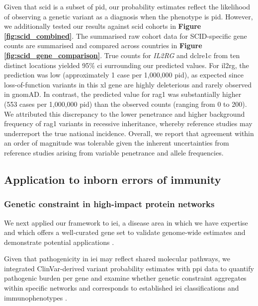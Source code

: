 Given that \ac{scid} is a subset of \ac{pid}, our probability estimates reflect the likelihood of observing a genetic variant as a diagnosis when the phenotype is \ac{pid}. 
However, we additionally tested our results against \ac{scid} cohorts in 
 \textbf{Figure \ref{fig:scid_combined}}.
The summarised raw cohort data for SCID-specific gene counts are summarised and compared across countries in \textbf{Figure \ref{fig:scid_gene_comparison}}.
True counts for \textit{IL2RG} and \ac{dclre1c} from ten distinct locations yielded 95\% \ac{ci} surrounding our predicted values. 
For \ac{il2rg}, the prediction was low (approximately 1 case per 1,000,000 \ac{pid}), as expected since loss-of-function variants in this \ac{xl} gene are highly deleterious and rarely observed in gnomAD. In contrast, the predicted value for \ac{rag1} was substantially higher (553 cases per 1,000,000 \ac{pid}) than the observed counts (ranging from 0 to 200). 
We attributed this discrepancy to the lower penetrance and higher background frequency of \ac{rag1} variants in recessive inheritance, whereby reference studies may underreport the true national incidence. 
Overall, we report that agreement within an order of magnitude was tolerable given the inherent uncertainties from reference studies arising from variable penetrance and allele frequencies.

\FloatBarrier

\subsection{Application to inborn errors of immunity}
\subsubsection{Genetic constraint in high-impact protein networks}

We next applied our framework to \ac{iei},  a disease area in which we have expertise and which offers a well-curated gene set to validate genome-wide estimates and demonstrate potential applications \cite{poli_human_2025}. 

Given that pathogenicity in \ac{iei} may reflect shared molecular pathways, we integrated ClinVar-derived variant probability estimates with \ac{ppi}  data to quantify pathogenic burden per gene and examine whether genetic constraint aggregates within specific networks and corresponds to established \ac{iei} classifications and immunophenotypes \cite{szklarczyk2025string, karczewski2020mutational}.

